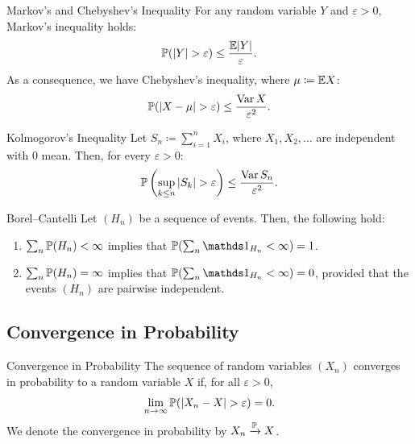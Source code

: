 \begin{prop}{Markov's and Chebyshev's Inequality}{}
	For any random variable $Y$ and $\varepsilon > 0$, Markov's inequality holds:
	\begin{equation}
		\mathbb{P}(|Y| > \varepsilon) \le \frac{\mathbb{E}|Y|}{\varepsilon}.
		\label{eq:MarkovsInequality}
	\end{equation}
	As a consequence, we have Chebyshev's inequality, where $\mu \coloneqq \mathbb{E} X$:
	\begin{equation}
		\mathbb{P}(|X - \mu| > \varepsilon) \le \frac{\operatorname{Var} X}{\varepsilon^2}.
		\label{eq:ChebyshevsInequality}
	\end{equation}
\end{prop}

\begin{thm}{Kolmogorov's Inequality}{}
	Let $S_n \coloneqq \sum_{i=1}^n X_i$, where $X_1, X_2, \dots$ are independent with $0$ mean. Then, for every $\varepsilon > 0$:
	\begin{equation}
		\mathbb{P} \left( \sup_{k \le n} |S_k| > \varepsilon \right) \le \frac{\operatorname{Var} S_n}{\varepsilon^2}.
		\label{eq:KolmogorovsInequality}
	\end{equation}
\end{thm}

\begin{lem}{Borel--Cantelli}{}
	Let $(H_n)$ be a sequence of events. Then, the following hold:
	\begin{enumerate}
		\item $\sum_n \mathbb{P}(H_n) < \infty$ implies that $\Prob(\sum_n \I_{H_n} < \infty) = 1$.
		\item $\sum_n \mathbb{P}(H_n) = \infty$ implies that $\Prob(\sum_n \I_{H_n} < \infty) = 0$, provided that the events $(H_n)$ are pairwise independent.
	\end{enumerate}
\end{lem}

\subsection{Convergence in Probability}

\begin{defn}{Convergence in Probability}{}
	The sequence of random variables $(X_n)$ converges in probability to a random variable $X$ if, for all $\varepsilon > 0$,
	\begin{equation*}
		\lim_{n \to \infty} \mathbb{P}(|X_n - X| > \varepsilon) = 0.
	\end{equation*}
	We denote the convergence in probability by $X_n \xrightarrow{\mathbb{P}} X$.
\end{defn}

